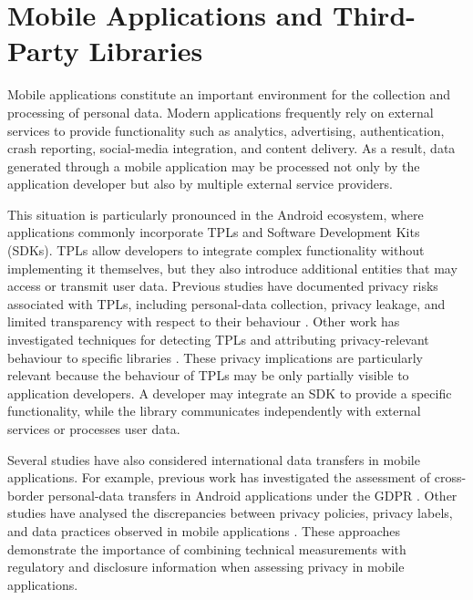 \section{Mobile Applications and Third-Party Libraries}
\label{sec:background_mobile_applications}

Mobile applications constitute an important environment for the collection and processing of personal data. Modern applications frequently rely on external services to provide functionality such as analytics, advertising, authentication, crash reporting, social-media integration, and content delivery. As a result, data generated through a mobile application may be processed not only by the application developer but also by multiple external service providers.

This situation is particularly pronounced in the Android ecosystem, where applications commonly incorporate TPLs and Software Development Kits (SDKs). TPLs allow developers to integrate complex functionality without implementing it themselves, but they also introduce additional entities that may access or transmit user data. Previous studies have documented privacy risks associated with TPLs, including personal-data collection, privacy leakage, and limited transparency with respect to their behaviour \cite{Pybus2024SuperMobile}. Other work has investigated techniques for detecting TPLs and attributing privacy-relevant behaviour to specific libraries \cite{Rodriguez2025PrivacySDKs}. These privacy implications are particularly relevant because the behaviour of TPLs may be only partially visible to application developers. A developer may integrate an SDK to provide a specific functionality, while the library communicates independently with external services or processes user data.

Several studies have also considered international data transfers in mobile applications. For example, previous work has investigated the assessment of cross-border personal-data transfers in Android applications under the GDPR \cite{Guaman2023AutomatedApplications}. Other studies have analysed the discrepancies between privacy policies, privacy labels, and data practices observed in mobile applications \cite{Jain2023ATLAS:Labels}. These approaches demonstrate the importance of combining technical measurements with regulatory and disclosure information when assessing privacy in mobile applications.

